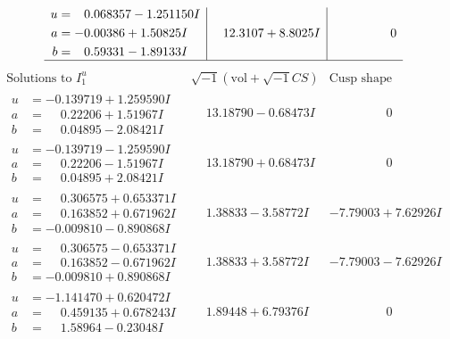 \documentclass[1p]{elsarticle_modified}
\theoremstyle{definition}
\newcommand{\I}{\sqrt{-1}}
\begin{document}
$$\begin{array}{c|c|c}
\begin{aligned}
u &= \phantom{-}0.068357 - 1.251150 I \\
a &= -0.00386 + 1.50825 I \\
b &= \phantom{-}0.59331 - 1.89133 I\end{aligned}
 & \phantom{-}12.3107 + 8.8025 I & \phantom{-0.000000 } 0\\
 \hline 
 \end{array}$$\newpage$$\begin{array}{c|c|c}  
\text{Solutions to }I^u_{1}& \I (\text{vol} + \sqrt{-1}CS) & \text{Cusp shape}\\
 \hline 
\begin{aligned}
u &= -0.139719 + 1.259590 I \\
a &= \phantom{-}0.22206 + 1.51967 I \\
b &= \phantom{-}0.04895 - 2.08421 I\end{aligned}
 & \phantom{-}13.18790 - 0.68473 I & \phantom{-0.000000 } 0 \\ \hline\begin{aligned}
u &= -0.139719 - 1.259590 I \\
a &= \phantom{-}0.22206 - 1.51967 I \\
b &= \phantom{-}0.04895 + 2.08421 I\end{aligned}
 & \phantom{-}13.18790 + 0.68473 I & \phantom{-0.000000 } 0 \\ \hline\begin{aligned}
u &= \phantom{-}0.306575 + 0.653371 I \\
a &= \phantom{-}0.163852 + 0.671962 I \\
b &= -0.009810 - 0.890868 I\end{aligned}
 & \phantom{-}1.38833 - 3.58772 I & -7.79003 + 7.62926 I \\ \hline\begin{aligned}
u &= \phantom{-}0.306575 - 0.653371 I \\
a &= \phantom{-}0.163852 - 0.671962 I \\
b &= -0.009810 + 0.890868 I\end{aligned}
 & \phantom{-}1.38833 + 3.58772 I & -7.79003 - 7.62926 I \\ \hline\begin{aligned}
u &= -1.141470 + 0.620472 I \\
a &= \phantom{-}0.459135 + 0.678243 I \\
b &= \phantom{-}1.58964 - 0.23048 I\end{aligned}
 & \phantom{-}1.89448 + 6.79376 I & \phantom{-0.000000 } 0 \\ \hline\begin{aligned}

\end{aligned}
\end{array}$$
\end{document}
